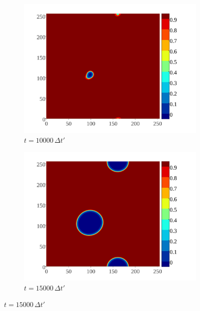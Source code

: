 \documentclass[english,12pt]{article}
\begin{document}
\begin{figure}[H]
    \centering
    \begin{subfigure}[b]{0.45\textwidth}
        \includegraphics[width=\textwidth]{pics/10000.pdf}
        \caption{$t=10000\,\Delta t'$}
        \label{fig:first}
    \end{subfigure}
    \begin{subfigure}[b]{0.45\textwidth}
        \includegraphics[width=\textwidth]{pics/15000.pdf}
        \caption{$t=15000\,\Delta t'$}
        \label{fig:second}
    \end{subfigure}
    

\end{figure}
\end{document}
